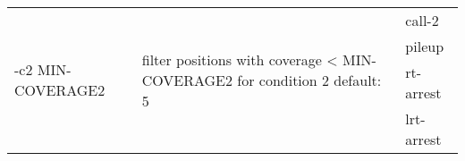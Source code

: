 {\small
\begin{tabular}{@{}p{}p{}l@{}}
\multirow{4}{=}{-c2 MIN-COVERAGE2} & \multirow{4}{=}{filter positions with coverage < MIN-COVERAGE2 for condition 2
default: 5} & call-2 \\
 &  & pileup \\
 &  & rt-arrest \\
 &  & lrt-arrest \\
\end{tabular}\\
}
